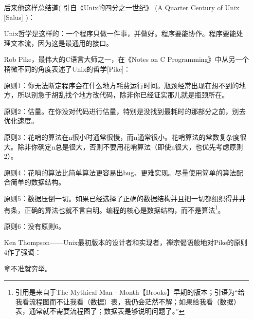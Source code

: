 \documentclass[11pt,oneside]{book}
\begin{document}
\begin{common-format}
后来他这样总结道( 引自《Unix的四分之一世纪》  (A Quarter Century of Unix [Salus]  )：

Unix哲学是这样的：一个程序只做一件事，并做好。程序要能协作。程序要能处理文本流，因为这是最通用的接口。
    
Rob Pike，最伟大的C语言大师之一，在《Notes on C \linebreak Programming》中从另一个稍微不同的角度表述了Unix的哲学[Pike]：

原则1：你无法断定程序会在什么地方耗费运行时间。瓶颈经常出现在想不到的地方，所以别急于胡乱找个地方改代码，除非你已经证实那儿就是瓶颈所在。

原则2：估量。在你没对代码进行估量，特别是没找到最耗时的那部分之前，别去优化速度。

原则3：花哨的算法在n很小时通常很慢，而n通常很小。花哨算法的常数复杂度很大。除非你确定n总是很大，否则不要用花哨算法（即使n很大，也优先考虑原则2）。

原则4：花哨的算法比简单算法更容易出bug、更难实现。尽量使用简单的算法配合简单的数据结构。

原则5：数据压倒一切。如果已经选择了正确的数据结构并且把一切都组织得井井有条，正确的算法也就不言自明。编程的核心是数据结构，而不是算法\footnote{引用是来自于The Mythical Man - Month【Brooks】早期的版本；引语为“给我看流程图而不让我看（数据）表，我仍会茫然不解；如果给我看（数据）表，通常就不需要流程图了；数据表是够说明问题了。”}。

原则6：没有原则6。

Ken Thompson——Unix最初版本的设计者和实现者，禅宗偈语般地对Pike的原则4作了强调：

拿不准就穷举。
    

\end{common-format}
\end{document}
